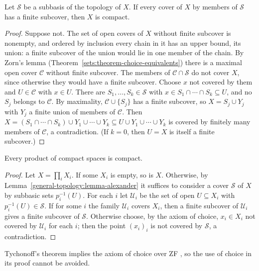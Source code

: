 \begin{lemma}\label{general-topology:lemma-alexander}
Let $\mathcal{S}$ be a subbasis of the topology of $X$. If every cover of $X$ by members of $\mathcal{S}$ has a finite subcover, then $X$ is compact.
\end{lemma}

\begin{proof}
Suppose not. The set of open covers of $X$ without finite subcover is nonempty, and ordered by inclusion every chain in it has an upper bound, its
union: a finite subcover of the union would lie in one member of the chain. By Zorn's lemma (Theorem~\ref{sets:theorem-choice-equivalents}) there is a
maximal open cover $\mathcal{C}$ without finite subcover. The members of $\mathcal{C} \cap \mathcal{S}$ do not cover $X$, since otherwise they would have
a finite subcover. Choose $x$ not covered by them and $U \in \mathcal{C}$ with $x \in U$. There are $S_1, \ldots, S_k \in \mathcal{S}$ with
$x \in S_1 \cap \cdots \cap S_k \subseteq U$, and no $S_j$ belongs to $\mathcal{C}$. By maximality, $\mathcal{C} \cup \{S_j\}$ has a finite subcover, so
$X = S_j \cup Y_j$ with $Y_j$ a finite union of members of $\mathcal{C}$. Then $X = (S_1 \cap \cdots \cap S_k) \cup Y_1 \cup \cdots \cup Y_k \subseteq U \cup Y_1 \cup \cdots \cup Y_k$
is covered by finitely many members of $\mathcal{C}$, a contradiction. (If $k = 0$, then $U = X$ is itself a finite subcover.)
\end{proof}

\begin{theorem}[Tychonoff]\label{general-topology:theorem-tychonoff}
Every product of compact spaces is compact.
\end{theorem}

\begin{proof}
Let $X = \prod_i X_i$. If some $X_i$ is empty, so is $X$. Otherwise, by Lemma~\ref{general-topology:lemma-alexander} it suffices to consider a cover
$\mathcal{S}$ of $X$ by subbasic sets $p_i^{-1}(U)$. For each $i$ let $\mathcal{U}_i$ be the set of open $U \subseteq X_i$ with $p_i^{-1}(U) \in \mathcal{S}$.
If for some $i$ the family $\mathcal{U}_i$ covers $X_i$, then a finite subcover of $\mathcal{U}_i$ gives a finite subcover of $\mathcal{S}$. Otherwise choose,
by the axiom of choice, $x_i \in X_i$ not covered by $\mathcal{U}_i$ for each $i$; then the point $(x_i)_i$ is not covered by $\mathcal{S}$, a contradiction.
\end{proof}

\begin{remark}\label{general-topology:remark-tychonoff-choice}
Tychonoff's theorem implies the axiom of choice over ZF \cite{kelley-1950}, so the use of choice in its proof cannot be avoided.
\end{remark}

